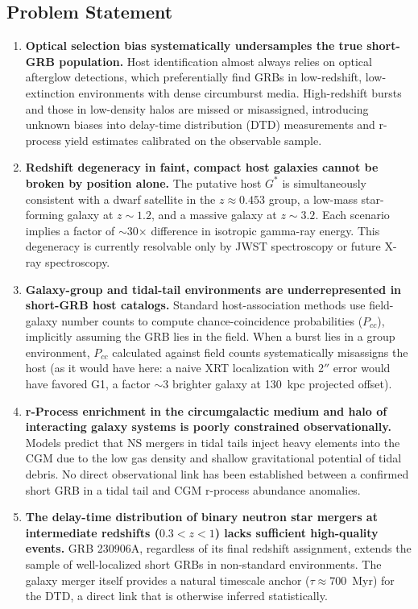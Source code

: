\documentclass[11pt,letterpaper]{article}
\begin{document}
\subsection{Problem Statement}

\begin{enumerate}[leftmargin=*, label=\textbf{P\arabic*.}]

  \item \textbf{Optical selection bias systematically undersamples the true short-GRB population.} Host identification almost always relies on optical afterglow detections, which preferentially find GRBs in low-redshift, low-extinction environments with dense circumburst media. High-redshift bursts and those in low-density halos are missed or misassigned, introducing unknown biases into delay-time distribution (DTD) measurements and r-process yield estimates calibrated on the observable sample.

  \item \textbf{Redshift degeneracy in faint, compact host galaxies cannot be broken by position alone.} The putative host $G^*$ is simultaneously consistent with a dwarf satellite in the $z \approx 0.453$ group, a low-mass star-forming galaxy at $z \sim 1.2$, and a massive galaxy at $z \sim 3.2$. Each scenario implies a factor of $\sim$30$\times$ difference in isotropic gamma-ray energy. This degeneracy is currently resolvable only by JWST spectroscopy or future X-ray spectroscopy.

  \item \textbf{Galaxy-group and tidal-tail environments are underrepresented in short-GRB host catalogs.} Standard host-association methods use field-galaxy number counts to compute chance-coincidence probabilities ($P_{cc}$), implicitly assuming the GRB lies in the field. When a burst lies in a group environment, $P_{cc}$ calculated against field counts systematically misassigns the host (as it would have here: a naive XRT localization with 2$''$ error would have favored G1, a factor $\sim$3 brighter galaxy at 130~kpc projected offset).

  \item \textbf{r-Process enrichment in the circumgalactic medium and halo of interacting galaxy systems is poorly constrained observationally.} Models predict that NS mergers in tidal tails inject heavy elements into the CGM due to the low gas density and shallow gravitational potential of tidal debris. No direct observational link has been established between a confirmed short GRB in a tidal tail and CGM r-process abundance anomalies.

  \item \textbf{The delay-time distribution of binary neutron star mergers at intermediate redshifts ($0.3 < z < 1$) lacks sufficient high-quality events.} GRB 230906A, regardless of its final redshift assignment, extends the sample of well-localized short GRBs in non-standard environments. The galaxy merger itself provides a natural timescale anchor ($\tau \approx 700$~Myr) for the DTD, a direct link that is otherwise inferred statistically.

\end{enumerate}
\end{document}
